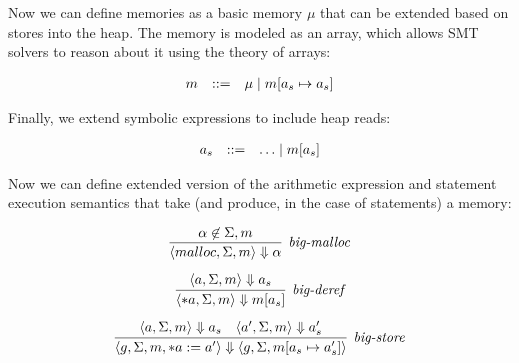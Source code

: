 \documentclass[11pt]{article}
\begin{document}
Now we can define memories as a basic memory $\mu$ that can be extended based on stores into the heap.  The memory is modeled as an array, which allows SMT solvers to reason about it using the theory of arrays:

\[
\begin{array}{lll}
m & ::= & \mu \mathrel{\mid} m[a_s \mapsto a_s] \\
\end{array}
\]

Finally, we extend symbolic expressions to include heap reads:

\[
\begin{array}{lll}
a_s & ::= & \ldots \mathrel{\mid} m[a_s] \\
\end{array}
\]

Now we can define extended version of the arithmetic expression and statement
execution semantics that take (and produce, in the case of statements) a memory:

\[
\begin{array}{c}

\infer[\textit{big-malloc}]{\langle malloc,\Sigma, m \rangle \Downarrow \alpha}{\alpha \not\in\Sigma, m} \\[2ex]

\infer[\textit{big-deref}]{\langle *a,\Sigma, m \rangle \Downarrow m[a_s]}{\langle a,\Sigma, m \rangle \Downarrow a_s} \\[2ex]

\infer[\textit{big-store}]
    {\langle g,\Sigma, m, *a := a' \rangle \Downarrow \langle g,\Sigma, m[a_s \mapsto a_s'] \rangle}
    {\langle a,\Sigma, m \rangle \Downarrow a_s & \langle a',\Sigma, m \rangle \Downarrow a_s'} \\[2ex]

\end{array}
\]





\end{document}

